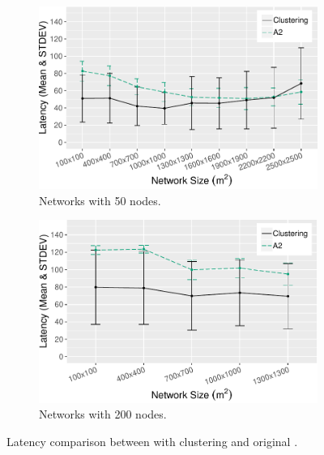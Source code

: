 \begin{figure}[bt]
    \centering
    \begin{subfigure}{0.45\textwidth}
        \centering
        \includegraphics[width=\textwidth]{figure/Results/ChaosComparison/ChaosComparison_50_Latency.pdf}
        \caption{Networks with 50 nodes.}
        \label{subfig:latency-50-nodes}
    \end{subfigure}
    \begin{subfigure}{0.45\textwidth}
        \centering
        \includegraphics[width=\textwidth]{figure/Results/ChaosComparison/ChaosComparison_200_Latency.pdf}
        \caption{Networks with 200 nodes.}
        \label{subfig:latency-200-nodes}
    \end{subfigure}
    \caption{Latency comparison between \atwo{} with clustering and original \atwo{}.}
    \label{fig:latency-results}
\end{figure}


